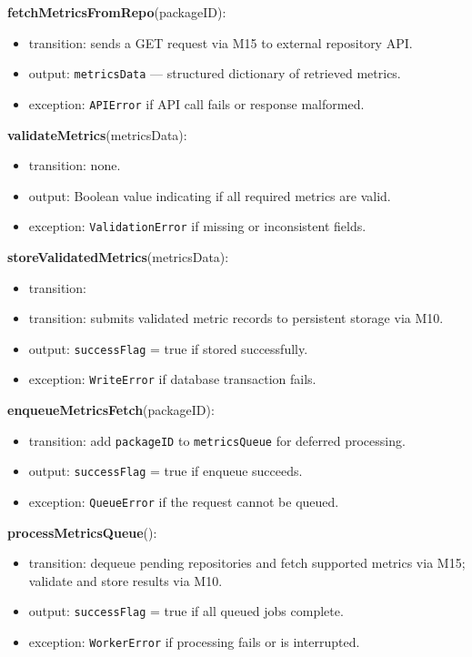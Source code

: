 \documentclass[12pt, titlepage]{article}
\begin{document}
\noindent \textbf{fetchMetricsFromRepo}(packageID):
\begin{itemize}
  \item transition: sends a GET request via M15 to external repository API.
  \item output: \texttt{metricsData} — structured dictionary of retrieved metrics.
  \item exception: \texttt{APIError} if API call fails or response malformed.
\end{itemize}

\noindent \textbf{validateMetrics}(metricsData):
\begin{itemize}
  \item transition: none.
  \item output: Boolean value indicating if all required metrics are valid.
  \item exception: \texttt{ValidationError} if missing or inconsistent fields.
\end{itemize}

\noindent \textbf{storeValidatedMetrics}(metricsData):
\begin{itemize}
  \item transition: \item transition: submits validated metric records to persistent storage via M10.
  \item output: \texttt{successFlag} = true if stored successfully.
  \item exception: \texttt{WriteError} if database transaction fails.
\end{itemize}

\noindent \textbf{enqueueMetricsFetch}(packageID):
\begin{itemize}
  \item transition: add \texttt{packageID} to \texttt{metricsQueue} for deferred processing.
  \item output: \texttt{successFlag} = true if enqueue succeeds.
  \item exception: \texttt{QueueError} if the request cannot be queued.
\end{itemize}

\noindent \textbf{processMetricsQueue}():
\begin{itemize}
  \item transition: dequeue pending repositories and fetch supported metrics
        via M15; validate and store results via M10.
  \item output: \texttt{successFlag} = true if all queued jobs complete.
  \item exception: \texttt{WorkerError} if processing fails or is interrupted.
\end{itemize}
\end{document}
